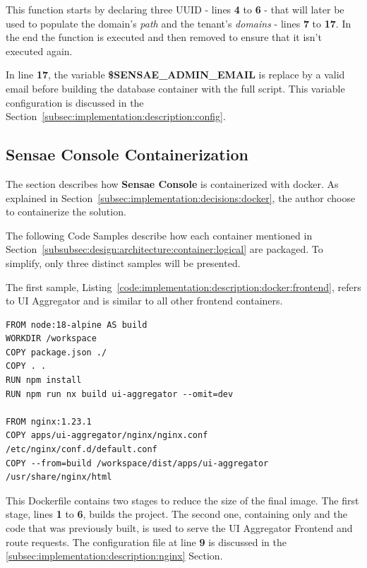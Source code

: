 This function starts by declaring three \gls{UUID} - lines \textbf{4} to \textbf{6} - that will later be used to populate the domain's \textit{path} and the tenant's \textit{domains} - lines \textbf{7} to \textbf{17}. In the end the function is executed and then removed to ensure that it isn't executed again.

In line \textbf{17}, the variable \textbf{\$SENSAE\_ADMIN\_EMAIL} is replace by a valid email before building the database container with the full script. This variable configuration is discussed in the Section~\ref{subsec:implementation:description:config}.

\subsection{Sensae Console Containerization}
\label{subsec:implementation:description:docker}

The section describes how \textbf{Sensae Console} is containerized with docker.
As explained in Section~\ref{subsec:implementation:decisions:docker}, the author choose to containerize the solution.

The following Code Samples describe how each container mentioned in Section~\ref{subsubsec:design:architecture:container:logical} are packaged. To simplify, only three distinct samples will be presented.

The first sample, Listing~\ref{code:implementation:description:docker:frontend}, refers to UI Aggregator and is similar to all other frontend containers.

\begin{lstlisting}[caption=Dockerfile for UI Aggregator Frontend, label={code:implementation:description:docker:frontend}]
FROM node:18-alpine AS build
WORKDIR /workspace
COPY package.json ./
COPY . .
RUN npm install
RUN npm run nx build ui-aggregator --omit=dev

FROM nginx:1.23.1
COPY apps/ui-aggregator/nginx/nginx.conf /etc/nginx/conf.d/default.conf
COPY --from=build /workspace/dist/apps/ui-aggregator /usr/share/nginx/html    
\end{lstlisting}

This Dockerfile contains two stages to reduce the size of the final image. The first stage, lines \textbf{1} to \textbf{6}, builds the project. The second one, containing only  and the code that was previously built, is used to serve the UI Aggregator Frontend and route requests. The  configuration file at line \textbf{9} is discussed in the \ref{subsec:implementation:description:nginx} Section.

